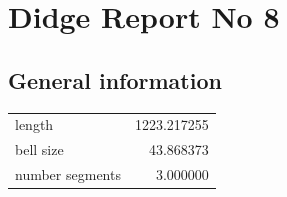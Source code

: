 \documentclass{article}
\begin{document}
\begin{centering}
\begin{figure}[!htb]
\end{figure}
\end{centering}
\section{Didge Report No 8}

\subsection{General information}
\begin{centering}

\begin{figure}[!htb]
\end{figure}
\begin{tabular}{lr}
\toprule
         length & 1223.217255 \\
      bell size &   43.868373 \\
number segments &    3.000000 \\
\bottomrule
\end{tabular}
\end{centering}
\end{document}
